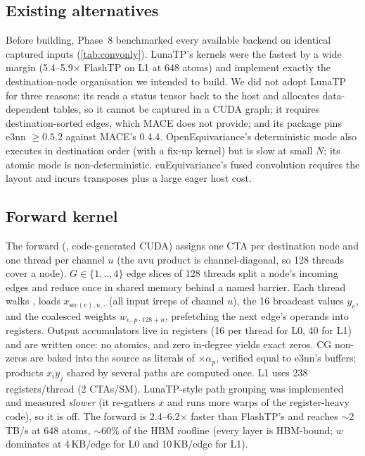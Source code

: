 \subsection{Existing alternatives}
Before building, Phase~8 benchmarked every available backend on identical captured inputs (\cref{tab:convonly}). LunaTP's kernels were the fastest by a wide margin (5.4--5.9$\times$ FlashTP on L1 at 648 atoms) and implement exactly the destination-node organisation we intended to build. We did not adopt LunaTP for three reasons: its  reads a status tensor back to the host and allocates data-dependent tables, so it cannot be captured in a CUDA graph; it requires destination-sorted edges, which MACE does not provide; and its package pins e3nn $\ge0.5.2$ against MACE's 0.4.4. OpenEquivariance's deterministic mode also executes in destination order (with a fix-up kernel) but is slow at small $N$; its atomic mode is non-deterministic. cuEquivariance's fused convolution requires the  layout and incurs transposes plus a large eager host cost.

\subsection{Forward kernel}
The forward (, code-generated CUDA) assigns one CTA per destination node and one thread per channel $u$ (the uvu product is channel-diagonal, so 128 threads cover a node). $G\in\{1,..,4\}$ edge slices of 128 threads split a node's incoming edges and reduce once in shared memory behind a named barrier. Each thread walks , loads $x_{\mathrm{src}(e),u,\cdot}$ (all input irreps of channel $u$), the 16 broadcast values $y_e$, and the coalesced weights $w_{e,\,p\cdot128+u}$, prefetching the next edge's operands into registers. Output accumulators live in registers (16 per thread for L0, 40 for L1) and are written once: no atomics, and zero in-degree yields exact zeros. CG non-zeros are baked into the source as  literals of $\times\alpha_p$, verified equal to e3nn's buffers; products $x_i y_j$ shared by several paths are computed once. L1 uses 238 registers/thread (2 CTAs/SM). LunaTP-style path grouping was implemented and measured \emph{slower} (it re-gathers $x$ and runs more warps of the register-heavy code), so it is off. The forward is 2.4--6.2$\times$ faster than FlashTP's and reaches $\sim$2\,TB/s at 648 atoms, $\sim$60\% of the HBM roofline (every layer is HBM-bound; $w$ dominates at 4\,KB/edge for L0 and 10\,KB/edge for L1).

